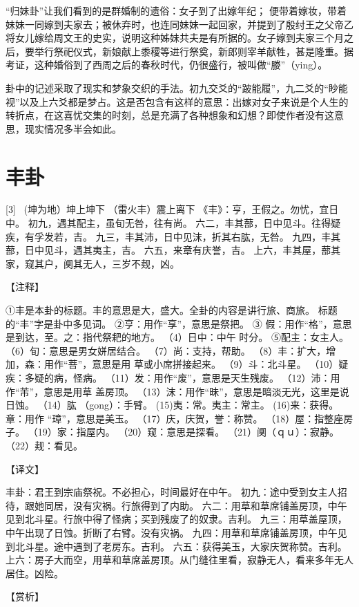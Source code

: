 \documentclass[12pt,UTF8]{ctexbook}
\begin{document}
“归妹卦”让我们看到的是群婚制的遗俗：女子到了出嫁年纪； 便带着嫁妆，带着妹妹一同嫁到夫家去；被休弃时，也连同妹妹一起回家，并提到了殷纣王之父帝乙将女儿嫁给周文王的史实，说明这种姊妹共夫是有所据的。女子嫁到夫家三个月之后，要举行祭祀仪式，新娘献上黍稷等进行祭奠，新郎则宰羊献牲，甚是隆重。据考证，这种婚俗到了西周之后的春秋时代，仍很盛行，被叫做“媵”（ying）。

卦中的记述采取了现实和梦象交织的手法。初九交爻的“跛能履”，九二爻的“眇能视”以及上六爻都是梦占。这是否包含有这样的意思：出嫁对女子来说是个人生的转折点，在这喜忧交集的时刻，总是充满了各种想象和幻想？即使作者没有这意思，现实情况多半会如此。

\chapter{丰卦}
[3] \ (坤为地）坤上坤下
（雷火丰）震上离下
《丰》：亨，王假之。勿忧，宜日中。
初九，遇其配主，虽旬无咎，往有尚。
六二，丰其蔀，日中见斗。往得疑疾，有孚发若，吉。
九三，丰其沛，日中见沫，折其右肱，无咎。
九四，丰其蔀，日中见斗，遇其夷主，吉。
六五，来章有庆誉，吉。
上六，丰其屋，蔀其家，窥其户，阒其无人，三岁不觌，凶。

【注释】

①丰是本卦的标题。丰的意思是大，盛大。全卦的内容是讲行旅、商旅。 标题的“丰”字是卦中多见词。
②亨：用作“享”，意思是祭把。
③ 假：用作“格”，意思是到达，至。之：指代祭耙的地方。
（4）日中：中午 时分。
⑤配主：女主人。
（6）旬：意思是男女姘居结合。
（7）尚：支持，帮助。
（8）丰：扩大，增加，森：用作“菩”，意思是用 草或小席拼接起来。
（9）斗：北斗星。
（10）疑疾：多疑的病，怪病。
（11）发：用作“废”，意思是天生残废。
（12）沛：用作“芾”，意思是用草 盖房顶。
（13）沫：用作“昧”，意思是暗淡无光，这里是说日蚀。
（14）肱 （gong）：手臂。
(15)夷：常。夷主：常主。
(16)来：获得。章：用作 “璋”，意思是美玉。
（17）庆，庆贺，誉：称赞。
（18）屋：指整座房子。
（19）家：指屋内。
（20）窥：意思是探看。
（21）阒（ｑｕ）：寂静。
（22）觌：看见。

【译文】

丰卦：君王到宗庙祭祝。不必担心，时间最好在中午。
初九：途中受到女主人招待，跟她同居，没有灾祸。行旅得到了内助。
六二：用草和草席铺盖房顶，中午见到北斗星。行旅中得了怪病；买到残废了的奴隶。吉利。
九三：用草盖屋顶，中午出现了日蚀。折断了右臂。没有灾祸。
九四：用草和草席铺盖房顶，中午见到北斗星。途中遇到了老房东。吉利。
六五：获得美玉，大家庆贺称赞。吉利。
上六：房子大而空，用草和草席盖房顶。从门缝往里看，寂静无人，看来多年无人居住。凶险。

【赏析】
\end{document}
